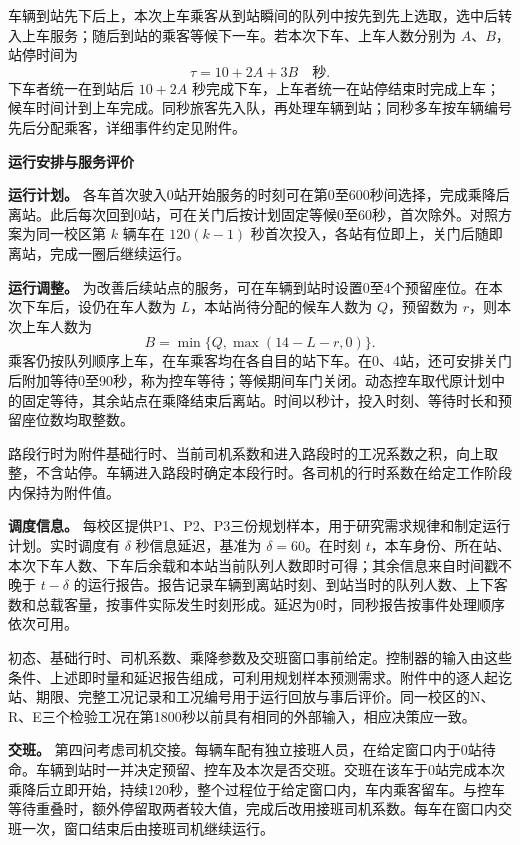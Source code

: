 \documentclass[11pt,a4paper]{article}
\begin{document}
车辆到站先下后上，本次上车乘客从到站瞬间的队列中按先到先上选取，选中后转入上车服务；随后到站的乘客等候下一车。若本次下车、上车人数分别为 $A、B$，站停时间为
\[
\tau=10+2A+3B\quad\text{秒}.
\]
下车者统一在到站后 $10+2A$ 秒完成下车，上车者统一在站停结束时完成上车；候车时间计到上车完成。同秒旅客先入队，再处理车辆到站；同秒多车按车辆编号先后分配乘客，详细事件约定见附件。

\newpage
\begin{center}{\large\bfseries 运行安排与服务评价}\end{center}

\textbf{运行计划。} 各车首次驶入0站开始服务的时刻可在第0至600秒间选择，完成乘降后离站。此后每次回到0站，可在关门后按计划固定等候0至60秒，首次除外。对照方案为同一校区第 $k$ 辆车在 $120(k-1)$ 秒首次投入，各站有位即上，关门后随即离站，完成一圈后继续运行。

\textbf{运行调整。} 为改善后续站点的服务，可在车辆到站时设置0至4个预留座位。在本次下车后，设仍在车人数为 $L$，本站尚待分配的候车人数为 $Q$，预留数为 $r$，则本次上车人数为
\[
B=\min\{Q,\max(14-L-r,0)\}.
\]
乘客仍按队列顺序上车，在车乘客均在各自目的站下车。在0、4站，还可安排关门后附加等待0至90秒，称为控车等待；等候期间车门关闭。动态控车取代原计划中的固定等待，其余站点在乘降结束后离站。时间以秒计，投入时刻、等待时长和预留座位数均取整数。

路段行时为附件基础行时、当前司机系数和进入路段时的工况系数之积，向上取整，不含站停。车辆进入路段时确定本段行时。各司机的行时系数在给定工作阶段内保持为附件值。

\textbf{调度信息。} 每校区提供P1、P2、P3三份规划样本，用于研究需求规律和制定运行计划。实时调度有 $\delta$ 秒信息延迟，基准为 $\delta=60$。在时刻 $t$，本车身份、所在站、本次下车人数、下车后余载和本站当前队列人数即时可得；其余信息来自时间戳不晚于 $t-\delta$ 的运行报告。报告记录车辆到离站时刻、到站当时的队列人数、上下客数和总载客量，按事件实际发生时刻形成。延迟为0时，同秒报告按事件处理顺序依次可用。

初态、基础行时、司机系数、乘降参数及交班窗口事前给定。控制器的输入由这些条件、上述即时量和延迟报告组成，可利用规划样本预测需求。附件中的逐人起讫站、期限、完整工况记录和工况编号用于运行回放与事后评价。同一校区的N、R、E三个检验工况在第1800秒以前具有相同的外部输入，相应决策应一致。

\textbf{交班。} 第四问考虑司机交接。每辆车配有独立接班人员，在给定窗口内于0站待命。车辆到站时一并决定预留、控车及本次是否交班。交班在该车于0站完成本次乘降后立即开始，持续120秒，整个过程位于给定窗口内，车内乘客留车。与控车等待重叠时，额外停留取两者较大值，完成后改用接班司机系数。每车在窗口内交班一次，窗口结束后由接班司机继续运行。
\end{document}
